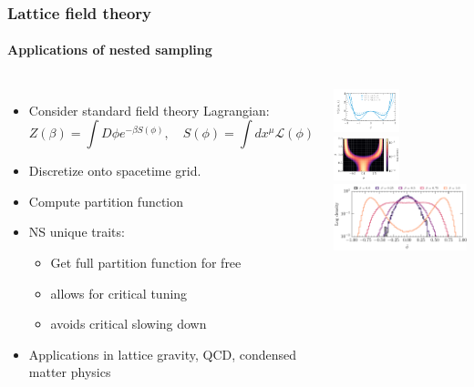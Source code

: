 \documentclass[aspectratio=169,handout]{beamer}
\begin{document}
\begin{frame}
    \frametitle{Lattice field theory}
    \framesubtitle{Applications of nested sampling}
    \begin{columns}
        \begin{itemize}
            \item Consider standard field theory Lagrangian:
                \[ Z(\beta) = \int D\phi e^{-\beta S(\phi)}, \quad S(\phi) = \int dx^\mu \mathcal{L}(\phi) \]
            \item Discretize onto spacetime grid.
            \item Compute partition function
            \item NS unique traits:
                \begin{itemize}
                    \item Get full partition function for free
                    \item allows for critical tuning
                    \item avoids critical slowing down
                \end{itemize}
            \item Applications in lattice gravity, QCD, condensed matter physics
        \end{itemize}
        \includegraphics[width=0.49\textwidth]{figures/potential_shape}
        \includegraphics[width=0.49\textwidth]{figures/2d_phase}
        \includegraphics[width=\textwidth]{figures/lattice_field_theory.pdf}
    \end{columns}
\end{frame}
\end{document}
